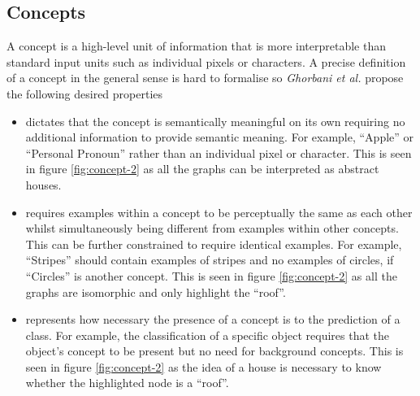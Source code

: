 \subsection{Concepts}



A concept is a high-level unit of information that is more interpretable than standard input units such as individual pixels or characters.
A precise definition of a concept in the general sense is hard to formalise so \textit{Ghorbani et al.}\cite{ghorbani2019towards} propose the following desired properties
\begin{itemize}
    \item[]
        dictates that the concept is semantically meaningful on its own requiring no additional information to provide semantic meaning.
        For example, ``Apple'' or ``Personal Pronoun'' rather than an individual pixel or character.
        This is seen in figure \ref{fig:concept-2} as all the graphs can be interpreted as abstract houses.
    \item[]
        requires examples within a concept to be perceptually the same as each other whilst simultaneously being different from examples within other concepts.
        This can be further constrained to require identical examples.
        For example, ``Stripes'' should contain examples of stripes and no examples of circles, if ``Circles'' is another concept.
        This is seen in figure \ref{fig:concept-2} as all the graphs are isomorphic and only highlight the ``roof''.
    \item[]
        represents how necessary the presence of a concept is to the prediction of a class.
        For example, the classification of a specific object requires that the object's concept to be present but no need for background concepts.
        This is seen in figure \ref{fig:concept-2} as the idea of a house is necessary to know whether the highlighted node is a ``roof''.
\end{itemize}


